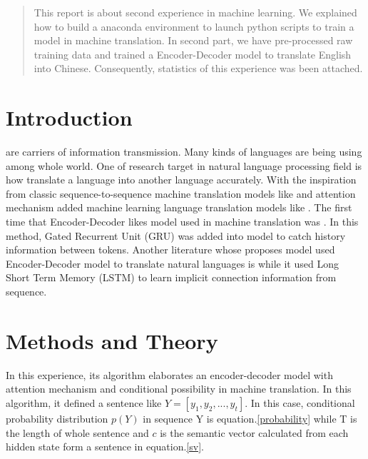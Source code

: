 \documentclass[journal, a4paper]{IEEEtran}
\begin{document}
\begin{abstract}
This report is about second experience in machine learning. We explained how to build a anaconda environment to launch python scripts to train a model in machine translation. In second part, we have pre-processed raw training data and trained a Encoder-Decoder model to translate English into Chinese. Consequently, statistics of this experience was been attached.
\end{abstract}

\section{Introduction}
 are carriers of information transmission. Many kinds of languages are being using among whole world. One of research target in natural language processing field is how translate a language into another language accurately. With the inspiration from classic sequence-to-sequence machine translation models like \cite{1703.01619} and attention mechanism added machine learning language translation models like \cite{10.5555/3295222.3295349}. The first time that Encoder-Decoder likes model used in machine translation was \cite{cho-etal-2014-learning}. In this method, Gated Recurrent Unit (GRU) was added into model to catch history information between tokens. Another literature whose proposes model used Encoder-Decoder model to translate natural languages is \cite{10.5555/2969033.2969173} while it used Long Short Term Memory (LSTM) to learn implicit connection information from sequence.

\section{Methods and Theory}
In this experience, its algorithm elaborates an encoder-decoder model with attention mechanism and conditional possibility in machine translation. In this algorithm, it defined a sentence like $ Y=[y_1,y_2,...,y_{t}] $. In this case, conditional probability distribution $ p(Y) $ in sequence Y is equation.\ref{probability} while T is the length of whole sentence and $ c  $ is the semantic vector calculated from each hidden state form a sentence in equation.\ref{sv}.
\end{document}
